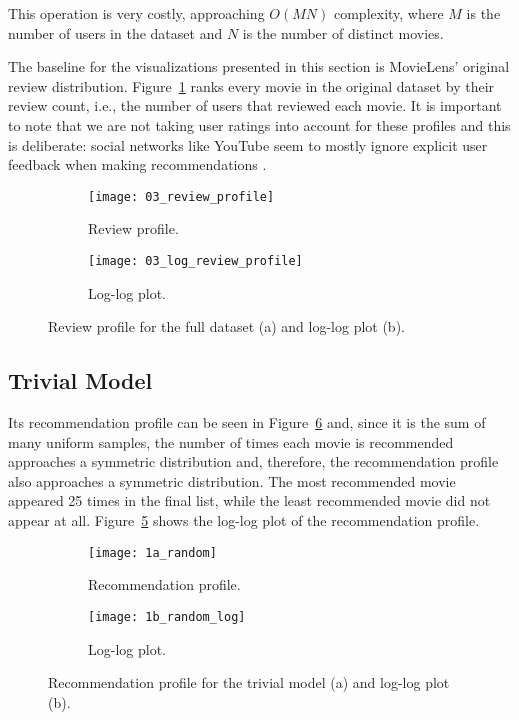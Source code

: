 This operation is very costly, approaching $O(MN)$ complexity, where $M$ is the
number of users in the dataset and $N$ is the number of distinct movies.

The baseline for the visualizations presented in this section is MovieLens'
original review distribution. Figure~\ref{fig:fig03_review_profile} ranks every
movie in the original dataset by their review count, i.e., the number of users
that reviewed each movie. It is important to note that we are not taking user
ratings into account for these profiles and this is deliberate: social networks
like YouTube seem to mostly ignore explicit user feedback when making
recommendations \citep{noauthor_mozilla_nodate}.

\begin{figure}
  \centering
  \begin{subfigure}{0.45\textwidth}
    \centering
    \texttt{[image: 03\_review\_profile]}
    \caption{Review profile.\label{fig:fig03_review_profile}}
  \end{subfigure}
  \begin{subfigure}{0.45\textwidth}
    \centering
    \texttt{[image: 03\_log\_review\_profile]}
    \caption{Log-log plot.\label{fig:fig03_log_review_profile}}
  \end{subfigure}
  \caption{Review profile for the full dataset (a) and log-log
  plot (b).\label{fig:fig03_review_profile_both}}
\end{figure}

\subsection{Trivial Model}
\label{subsec:trivial}

Its recommendation profile can be seen in Figure~\ref{fig:fig1} and, since it is
the sum of many uniform samples, the number of times each movie is recommended
approaches a symmetric distribution and, therefore, the recommendation profile
also approaches a symmetric  distribution. The most recommended movie appeared 25
times in the final list, while the least recommended movie did not appear at
all. Figure~\ref{fig:fig1b} shows the log-log plot of the recommendation
profile.

\begin{figure}
  \centering
  \begin{subfigure}{0.45\textwidth}
    \centering
    \texttt{[image: 1a\_random]}
    \caption{Recommendation profile.\label{fig:fig1a}}
  \end{subfigure}
  \begin{subfigure}{0.45\textwidth}
    \centering
    \texttt{[image: 1b\_random\_log]}
    \caption{Log-log plot.\label{fig:fig1b}}
  \end{subfigure}
  \caption{Recommendation profile for the trivial model (a) and log-log plot
    (b).\label{fig:fig1}}
\end{figure}

